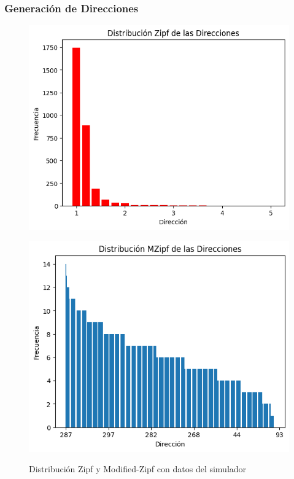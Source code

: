 \documentclass[11pt]{beamer}
\begin{document}
	\begin{frame}
		\frametitle{Generación de Direcciones}
		\begin{figure}[ht]
			\centering
			\begin{minipage}[t]{0.48\textwidth}
				\centering
				\includegraphics[width=\textwidth]{zipf.png}
				\label{fig:zipf_dist}
			\end{minipage}
			\begin{minipage}[t]{0.48\textwidth}
				\centering
				\includegraphics[width=\textwidth]{mzipf.png}
				\label{fig:mzipf_dist}
			\end{minipage}
			\caption{Distribución Zipf y Modified-Zipf con datos del simulador}
		\end{figure}
	\end{frame}
\end{document}
